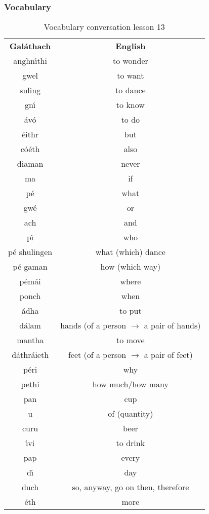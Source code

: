 \subsubsection{Vocabulary}

\begin{table}[H]
\centering
\begin{tabular}{cc}
  \toprule
  \textbf{Gal\'{a}thach} & \textbf{English}\\
  \cmidrule(lr){1-1}\cmidrule(lr){2-2}
  anghn\'{\i}thi & to wonder\\
  gwel & to want\\
  suling & to dance\\
  gn\'{\i} & to know\\
  \'{a}v\'{o} & to do\\
  \'{e}ithr & but\\
  c\'{o}\'{e}th & also\\
  diaman & never\\
  ma & if\\
  p\'{e} & what\\
  gw\'{e} & or\\
  ach & and\\
  p\'{\i} & who\\
  p\'{e} shulingen & what (which) dance\\
  p\'{e} gaman & how (which way)\\
  p\'{e}m\'{a}i & where\\
  ponch & when\\
  \'{a}dha & to put\\
  d\'{a}lam & hands (of a person $\rightarrow$ a pair of hands)\\
  mantha & to move\\
  d\'{a}thr\'{a}ieth & feet (of a person $\rightarrow$ a pair of feet)\\
  p\'{e}ri & why\\
  pethi & how much/how many\\
  pan & cup\\
  u & of (quantity)\\
  curu & beer\\
  \'{\i}vi & to drink\\
  pap & every\\
  d\'{\i} & day\\
  duch & so, anyway, go on then, therefore\\
  \'{e}th & more\\
  \bottomrule
\end{tabular}
\label{vocab_conversation_lesson13}
\caption{Vocabulary conversation lesson 13}
\end{table}

